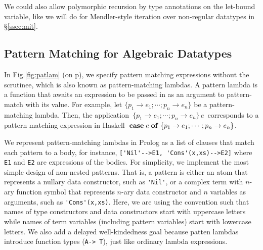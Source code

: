 \documentclass[runningheads,a4paper]{llncs}
\begin{document}
We could also allow polymorphic recursion by type annotations
on the let-bound variable, like we will do for Mendler-style iteration
over non-regular datatypes in \S\ref{ssec:mit}.


\subsection{Pattern Matching for Algebraic Datatypes}\label{ssec:patlam}
In Fig.\ref{fig:patlam} (on p\pageref{fig:patlam}), we specify
pattern matching expressions without the scrutinee, which is
also known as pattern-matching lambdas. A pattern lambda is
a function that awaits an expression to be passed in
as an argument to pattern-match with its value. For example,
let $\{p_1\to e_1;\cdots; p_n\to e_n\}$ be a pattern-matching lambda.
Then, the application $\,\{p_1\to e_1;\cdots; p_n\to e_n\}\,e\,$
corresponds to a pattern matching expression in Haskell
${\bf\;case}\;e\;{\bf of}\;\{p_1\to e_1;\cdots; p_n\to e_n\}$.

We represent pattern-matching lambdas in Prolog as a list of clauses
that match each pattern to a body, for instance,
\verb|['Nil'-->E1, 'Cons'(x,xs)-->E2]|
where \verb|E1| and \verb|E2| are expressions of the bodies. For simplicity,
we implement the most simple design of non-nested patterns. That is,
a pattern is either an atom that represents a nullary data constructor,
such as \verb|'Nil'|, or a complex term with $n$-ary function symbol
that represents $n$-ary data constructor and $n$ variables as arguments,
such as \verb|'Cons'(x,xs)|.
Here, we are using the convention
such that names of type constructors and data constructors start with 
uppercase letters while names of term variables (including pattern variables)
start with lowercase letters. We also add a delayed well-kindedness goal
because patten lambdas introduce function types (\verb|A-> T|), just like
ordinary lambda expressions.

\end{document}
